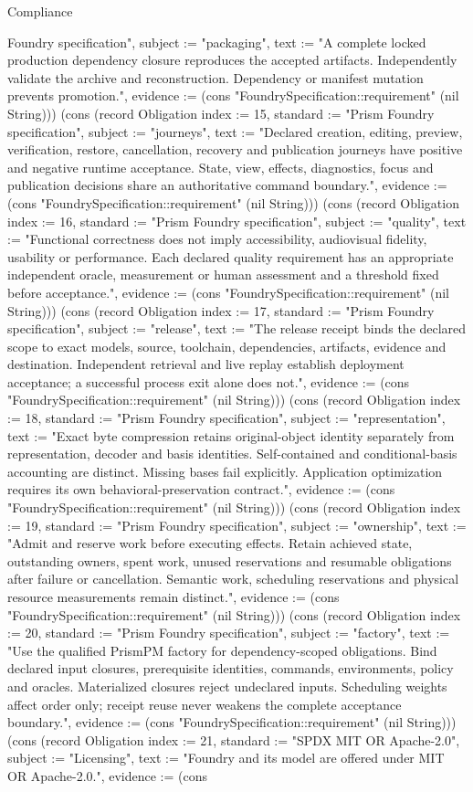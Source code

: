 \begin{lexlean}{Compliance}
\begin{semanticmodule}
{Foundry specification", subject := "packaging", text := "A complete locked production dependency closure reproduces the accepted artifacts. Independently validate the archive and reconstruction. Dependency or manifest mutation prevents promotion.", evidence := (cons "FoundrySpecification::requirement" (nil String))}) (cons (record Obligation {index := 15, standard := "Prism Foundry specification", subject := "journeys", text := "Declared creation, editing, preview, verification, restore, cancellation, recovery and publication journeys have positive and negative runtime acceptance. State, view, effects, diagnostics, focus and publication decisions share an authoritative command boundary.", evidence := (cons "FoundrySpecification::requirement" (nil String))}) (cons (record Obligation {index := 16, standard := "Prism Foundry specification", subject := "quality", text := "Functional correctness does not imply accessibility, audiovisual fidelity, usability or performance. Each declared quality requirement has an appropriate independent oracle, measurement or human assessment and a threshold fixed before acceptance.", evidence := (cons "FoundrySpecification::requirement" (nil String))}) (cons (record Obligation {index := 17, standard := "Prism Foundry specification", subject := "release", text := "The release receipt binds the declared scope to exact models, source, toolchain, dependencies, artifacts, evidence and destination. Independent retrieval and live replay establish deployment acceptance; a successful process exit alone does not.", evidence := (cons "FoundrySpecification::requirement" (nil String))}) (cons (record Obligation {index := 18, standard := "Prism Foundry specification", subject := "representation", text := "Exact byte compression retains original-object identity separately from representation, decoder and basis identities. Self-contained and conditional-basis accounting are distinct. Missing bases fail explicitly. Application optimization requires its own behavioral-preservation contract.", evidence := (cons "FoundrySpecification::requirement" (nil String))}) (cons (record Obligation {index := 19, standard := "Prism Foundry specification", subject := "ownership", text := "Admit and reserve work before executing effects. Retain achieved state, outstanding owners, spent work, unused reservations and resumable obligations after failure or cancellation. Semantic work, scheduling reservations and physical resource measurements remain distinct.", evidence := (cons "FoundrySpecification::requirement" (nil String))}) (cons (record Obligation {index := 20, standard := "Prism Foundry specification", subject := "factory", text := "Use the qualified PrismPM factory for dependency-scoped obligations. Bind declared input closures, prerequisite identities, commands, environments, policy and oracles. Materialized closures reject undeclared inputs. Scheduling weights affect order only; receipt reuse never weakens the complete acceptance boundary.", evidence := (cons "FoundrySpecification::requirement" (nil String))}) (cons (record Obligation {index := 21, standard := "SPDX MIT OR Apache-2.0", subject := "Licensing", text := "Foundry and its model are offered under MIT OR Apache-2.0.", evidence := (cons }
\end{semanticmodule}
\end{lexlean}
